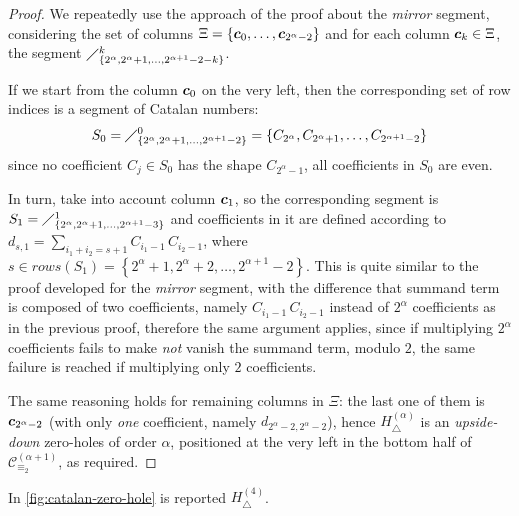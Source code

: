 \begin{proof}
We repeatedly use the approach
of the proof about the \emph{mirror} segment, considering the set of columns 
$\Xi=\lbrace \boldsymbol{c}_{0},\ldots, \boldsymbol{c}_{2^{{\alpha}}-2}\rbrace$ and
for each column $\boldsymbol{c}_{k}\in\Xi$, the segment
    $\diagup_{\lbrace 2^{\alpha},2^{\alpha}+1,\ldots,2^{\alpha+1}-2-k\rbrace}^{k}$.

If we start from the column $\boldsymbol{c}_{0}$ on the very left,
then the corresponding set of row indices is a segment of Catalan numbers:
\begin{displaymath}
    S_{0}=\diagup_{\lbrace 2^{\alpha},2^{\alpha}+1,\ldots,2^{\alpha+1}-2\rbrace}^{0}
        = \lbrace C_{2^{\alpha}},C_{2^{\alpha}+1},\ldots,C_{2^{\alpha+1}-2}\rbrace
\end{displaymath}
since no coefficient $C_{j}\in S_{0}$ has the shape $C_{2^{\alpha}-1}$, 
all coefficients in $S_{0}$ are even.

In turn, take into account column $\boldsymbol{c}_{1}$, so the corresponding segment is
    $S_{1}=\diagup_{\lbrace 2^{\alpha},2^{\alpha}+1,\ldots,2^{\alpha+1}-3\rbrace}^{1}$
and coefficients in it are defined according to 
$d_{s, 1} = \sum_{i_{1}+i_{2}=s+1} {C_{i_{1}-1}\,C_{i_{2}-1}}$,
where $s\in rows(S_{1})= \left\lbrace 2^{\alpha}+1,2^{\alpha}+2,\ldots,2^{\alpha+1}-2\right\rbrace$. 
This is quite similar to the proof developed for the \emph{mirror} segment,
with the difference that summand term is composed of two coefficients, namely
$C_{i_{1}-1}\,C_{i_{2}-1}$ instead of $2^{{\alpha}}$ coefficients as in the previous proof, 
therefore the same argument applies,
since if multiplying $2^{{\alpha}}$ coefficients fails to make \emph{not} vanish
the summand term, modulo $2$, the same failure is reached if multiplying only $2$ coefficients.

The same reasoning holds for remaining columns in $\Xi$: the last one of them is 
$\boldsymbol{c}_{2^{\alpha}-2}$ (with only \emph{one} coefficient, namely $d_{2^{\alpha}-2,2^{\alpha}-2}$), 
hence $H_{\bigtriangleup}^{({\alpha})}$ is an \emph{upside-down} zero-holes of order $\alpha$,
positioned at the very left in the bottom half of $\mathcal{C}_{\equiv_{2}}^{(\alpha+1)}$, as required.

\end{proof}


In \autoref{fig:catalan-zero-hole} is reported $H_{\bigtriangleup}^{(4)}$.


